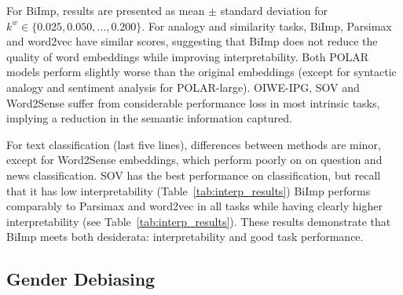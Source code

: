 \documentclass[11pt,a4paper]{article}
\def\proposedmethod{BiImp}
\begin{document}
For \proposedmethod{}, results are presented as mean $\pm$
standard deviation for $k^w \in \{0.025,0.050,...,0.200\}$. For analogy
and similarity tasks, \proposedmethod{}, Parsimax and
word2vec have similar scores, suggesting that
\proposedmethod{} does not reduce the quality of 
word embeddings while
improving interpretability. Both POLAR models perform
slightly worse than the original embeddings (except
for syntactic analogy and sentiment analysis for
POLAR-large). OIWE-IPG, SOV and Word2Sense suffer from
considerable performance loss in most 
intrinsic tasks, implying a reduction in the
semantic information captured.

For text
classification (last five lines),
differences between methods are minor, 
except for Word2Sense embeddings, which perform poorly on
on question and news classification.
SOV \citep{faruqui15sparse} has the
best performance on  classification,
but recall that it has low interpretability (Table~\ref{tab:interp_results})
\proposedmethod{}
performs comparably
to Parsimax and  word2vec
in all tasks while having clearly higher
interpretability (see Table~\ref{tab:interp_results}).
These results demonstrate that \proposedmethod{} meets both
desiderata: interpretability and good task performance.



\subsection{Gender Debiasing}
\end{document}
